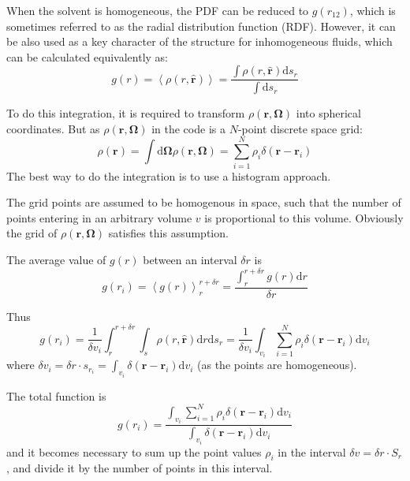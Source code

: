 When the solvent is homogeneous, the \acs{PDF} can be reduced to
$g(r_{12})$, which is sometimes referred to as the radial distribution
function (\acs{RDF}). However, it can be also used as a key character
of the structure for inhomogeneous fluids, which can be calculated
equivalently as:
\begin{equation}
g(r)=\left\langle \rho(r,\hat{\mathbf{r}})\right\rangle =\dfrac{\int\rho(r,\hat{\mathbf{r}})\mathrm{d}s_{r}}{\int\mathrm{d}s_{r}}
\end{equation}

To do this integration, it is required to transform $\rho(\mathbf{r},\mathbf{\Omega})$
into spherical coordinates. But as $\rho(\mathbf{r},\mathbf{\Omega})$
in the code is a $N$-point discrete space grid:
\begin{equation}
\rho(\mathbf{r})=\int\mathrm{d}\mathbf{\Omega}\rho(\mathbf{r},\mathbf{\Omega})=\sum_{i=1}^{N}\rho_{i}\delta(\mathbf{r}-\mathbf{r}_{i})
\end{equation}
The best way to do the integration is to use a histogram approach.

The grid points are assumed to be homogenous in space, such that the
number of points entering in an arbitrary volume $v$ is proportional
to this volume. Obviously the grid of $\rho(\mathbf{r},\mathbf{\Omega})$
satisfies this assumption.

The average value of $g(r)$ between an interval $\delta r$ is
\begin{equation}
g(r_{i})=\left\langle g(r)\right\rangle _{r}^{r+\delta r}=\dfrac{\int_{r}^{r+\delta r}g(r)\mathrm{d}r}{\delta r}
\end{equation}

Thus
\begin{equation}
g(r_{i})=\dfrac{1}{\delta v_{i}}\int_{r}^{r+\delta r}\int_{s}\rho(r,\hat{\mathbf{r}})\mathrm{d}r\mathrm{d}s_{r}=\dfrac{1}{\delta v_{i}}\int_{v_{i}}\sum_{i=1}^{N}\rho_{i}\delta(\mathbf{r}-\mathbf{r}_{i})\mathrm{d}v_{i}
\end{equation}
where $\delta v_{i}=\delta r\cdot s_{r_{i}}=\int_{v_{i}}\delta(\mathbf{r}-\mathbf{r}_{i})\mathrm{d}v_{i}$
(as the points are homogeneous). 

The total function is 
\begin{equation}
g(r_{i})=\dfrac{\int_{v_{i}}\sum_{i=1}^{N}\rho_{i}\delta(\mathbf{r}-\mathbf{r}_{i})\mathrm{d}v_{i}}{\int_{v_{i}}\delta(\mathbf{r}-\mathbf{r}_{i})\mathrm{d}v_{i}}
\end{equation}
and it becomes necessary to sum up the point values $\rho_{i}$ in
the interval $\delta v=\delta r\cdot S_{r}$, and divide it by the
number of points in this interval.

